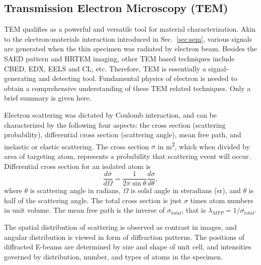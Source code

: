 \subsection{Transmission Electron Microscopy (TEM)}

TEM qualifies as a powerful and versatile tool for material characterization. Akin to the electron-materials interaction introduced in Sec.~\ref{sec:sem}, various signals are generated when the thin specimen was radiated by electron beam. Besides the SAED pattern and HRTEM imaging, other TEM based techniques include CBED, EDX, EELS and CL, etc. Therefore, TEM is essentially a signal-generating and detecting tool. Fundamental physics of electron is needed to obtain a comprehensive understanding of these TEM related techniques. Only a brief summary is given here.

Electron scattering was dictated by Coulomb interaction, and can be characterized by the following four aspects: the cross section (scattering probability), differential cross section (scattering angle), mean free path, and inelastic or elastic scattering. The cross section $\sigma$ in \si{m^2}, which when divided by area of targeting atom, represents a probability that scattering event will occur. Differential cross section for an isolated atom is 
\[
\frac{d\sigma}{d\Omega} = \frac{1}{2\pi \sin\theta} \frac{d\sigma}{d\theta},
\] 
where $\theta$ is scattering angle in radians, $\Omega$ is solid angle in steradians (sr), and $\theta$ is half of the scattering angle. The total cross section is just $\sigma$ times atom numbers in unit volume. The mean free path is the inverse of $\sigma_{total}$, that is $\lambda_{MFP} = 1/\sigma_{total}$. 

The spatial distribution of scattering is observed as contrast in images, and angular distribution is viewed in form of diffraction patterns. The positions of diffracted E-beams are determined by size and shape of unit cell, and intensities governed by distribution, number, and types of atoms in the specimen. 

